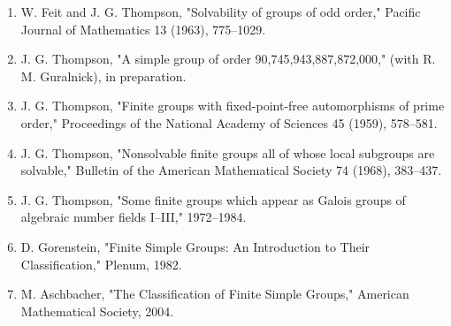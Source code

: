 \begin{enumerate}
\item W. Feit and J. G. Thompson, "Solvability of groups of odd order," Pacific Journal of Mathematics 13 (1963), 775--1029.
\item J. G. Thompson, "A simple group of order 90,745,943,887,872,000," (with R. M. Guralnick), in preparation.
\item J. G. Thompson, "Finite groups with fixed-point-free automorphisms of prime order," Proceedings of the National Academy of Sciences 45 (1959), 578--581.
\item J. G. Thompson, "Nonsolvable finite groups all of whose local subgroups are solvable," Bulletin of the American Mathematical Society 74 (1968), 383--437.
\item J. G. Thompson, "Some finite groups which appear as Galois groups of algebraic number fields I--III," 1972--1984.
\item D. Gorenstein, "Finite Simple Groups: An Introduction to Their Classification," Plenum, 1982.
\item M. Aschbacher, "The Classification of Finite Simple Groups," American Mathematical Society, 2004.
\end{enumerate}
